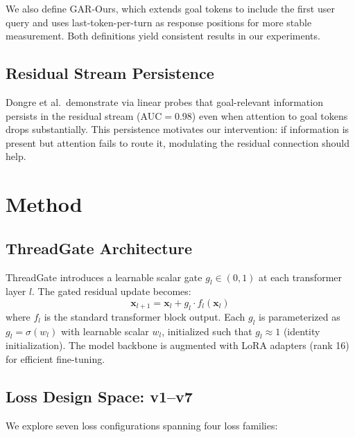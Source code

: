 \documentclass[11pt,a4paper]{article}
\begin{document}
We also define GAR-Ours, which extends goal tokens to include the first user query and uses last-token-per-turn as response positions for more stable measurement. Both definitions yield consistent results in our experiments.

\subsection{Residual Stream Persistence}

Dongre et al.\ demonstrate via linear probes that goal-relevant information persists in the residual stream (AUC$=$0.98) even when attention to goal tokens drops substantially. This persistence motivates our intervention: if information is present but attention fails to route it, modulating the residual connection should help.

\section{Method}

\subsection{ThreadGate Architecture}

ThreadGate introduces a learnable scalar gate $g_l \in (0,1)$ at each transformer layer $l$. The gated residual update becomes:
\begin{equation}
\mathbf{x}_{l+1} = \mathbf{x}_l + g_l \cdot f_l(\mathbf{x}_l)
\end{equation}
where $f_l$ is the standard transformer block output. Each $g_l$ is parameterized as $g_l = \sigma(w_l)$ with learnable scalar $w_l$, initialized such that $g_l \approx 1$ (identity initialization). The model backbone is augmented with LoRA adapters (rank 16) for efficient fine-tuning.

\subsection{Loss Design Space: v1--v7}

We explore seven loss configurations spanning four loss families:
\end{document}
